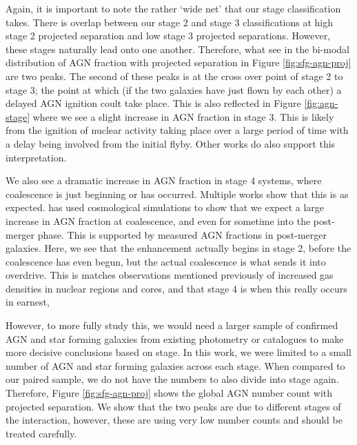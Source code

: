 \documentclass[fleqn,usenatbib]{mnras}
\begin{document}
Again, it is important to note the rather `wide net' that our stage classification takes. There is overlap between our stage 2 and stage 3 classifications at high stage 2 projected separation and low stage 3 projected separations. However, these stages naturally lead onto one another. Therefore, what see in the bi-modal distribution of AGN fraction with projected separation in Figure \ref{fig:sfg-agn-proj} are two peaks. The second of these peaks is at the cross over point of stage 2 to stage 3; the point at which (if the two galaxies have just flown by each other) a delayed AGN ignition coult take place. This is also reflected in Figure \ref{fig:agn-stage} where we see a slight increase in AGN fraction in stage 3. This is likely from the ignition of nuclear activity taking place over a large period of time with a delay being involved from the initial flyby. Other works do also support this interpretation.

We also see a dramatic increase in AGN fraction in stage 4 systems, where coalescence is just beginning or has occurred. Multiple works show that this is as expected. \citet{2023MNRAS.519.4966B} has used cosmological simulations to show that we expect a large increase in AGN fraction at coalescence, and even for sometime into the post-merger phase. This is supported by measured AGN fractions in post-merger galaxies. Here, we see that the enhancement actually begins in stage 2, before the coalescence has even begun, but the actual coalescence is what sends it into overdrive. This is matches observations mentioned previously of increased gas densities in nuclear regions and cores, and that stage 4 is when this really occurs in earnest,

However, to more fully study this, we would need a larger sample of confirmed AGN and star forming galaxies from existing photometry or catalogues to make more decisive conclusions based on stage. In this work, we were limited to a small number of AGN and star forming galaxies across each stage. When compared to our paired sample, we do not have the numbers to also divide into stage again. Therefore, Figure \ref{fig:sfg-agn-proj} shows the global AGN number count with projected separation. We show that the two peaks are due to different stages of the interaction, however, these are using very low number counts and should be treated carefully.
 
\end{document}
